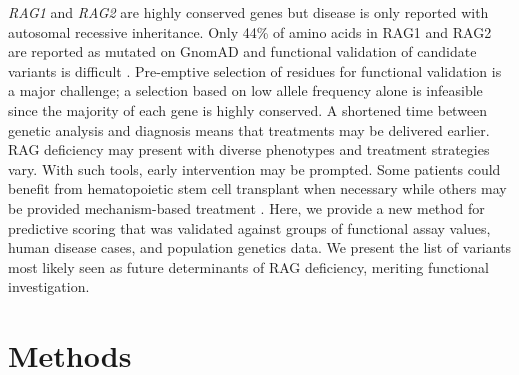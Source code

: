 \documentclass[preprint,11pt,fleqn]{elsarticle}
\begin{document}
\textit{RAG1} and \textit{RAG2} are highly conserved genes but disease is only reported with autosomal recessive inheritance. 
Only 44\% of amino acids in RAG1 and RAG2 are reported as mutated on GnomAD and functional validation of candidate variants is difficult
\citep{lek2016analysis}. 
Pre-emptive selection of residues for functional validation is a major challenge; a selection based on low allele frequency alone is infeasible since the majority of each gene is highly conserved.
A shortened time between genetic analysis and diagnosis means that treatments may be delivered earlier. 
RAG deficiency may present with diverse phenotypes and treatment strategies vary.
With such tools, early intervention may be prompted. Some patients could benefit from hematopoietic stem cell transplant \citep{john2016unrelated} when necessary while others may be provided mechanism-based treatment \citep{casanova2014guidelines}. 
Here, we provide a new method for predictive scoring that was validated against groups of functional assay values, human disease cases, and population genetics data.
We present the list of variants most likely seen as future determinants of RAG deficiency, meriting functional investigation.


\section*{Methods}
\end{document}
